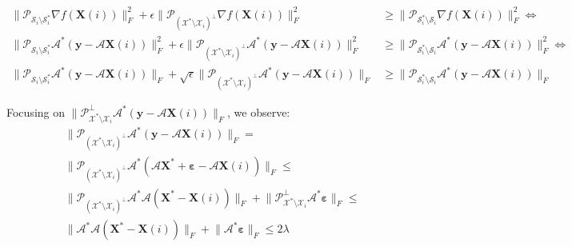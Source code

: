 \documentclass[twocolumn]{svjour3}
\newcommand{\vectornormbig}[1]{\big\|#1\big\|}
\newcommand{\obs}{\boldsymbol{y}}
\newcommand{\sensing}{\boldsymbol{\mathcal{A}}}
\newcommand{\signal}{\boldsymbol{X}}
\newcommand{\bestsignal}{\boldsymbol{X}^\ast}
\newcommand{\noise}{\boldsymbol{\varepsilon}}
\begin{document}
\begin{figure*}[!htp]
\begin{align}
\vectornormbig{\mathcal{P}_{\mathcal{S}_i \setminus \mathcal{S}_i^\ast} \nabla f(\signal(i))}_F^2 + \epsilon\vectornormbig{\mathcal{P}_{(\mathcal{X}^\ast\setminus \mathcal{X}_i)^\bot} \nabla f(\signal(i))}_F^2 &\geq \vectornormbig{\mathcal{P}_{\mathcal{S}_i^\ast \setminus \mathcal{S}_i} \nabla f(\signal(i))}_F^2 \Leftrightarrow \nonumber \\
\vectornormbig{\mathcal{P}_{\mathcal{S}_i \setminus \mathcal{S}_i^\ast} \sensing^\ast(\obs - \sensing \signal(i))}_F^2 + \epsilon\vectornormbig{\mathcal{P}_{(\mathcal{X}^\ast\setminus \mathcal{X}_i)^\bot} \sensing^\ast(\obs - \sensing \signal(i))}_F^2 &\geq \vectornormbig{\mathcal{P}_{\mathcal{S}_i^\ast \setminus \mathcal{S}_i} \sensing^\ast(\obs - \sensing \signal(i))}_F^2 \Leftrightarrow \nonumber \\
\vectornormbig{\mathcal{P}_{\mathcal{S}_i \setminus \mathcal{S}_i^\ast} \sensing^\ast(\obs - \sensing \signal(i))}_F + \sqrt{\epsilon}\vectornormbig{\mathcal{P}_{(\mathcal{X}^\ast\setminus \mathcal{X}_i)^\bot} \sensing^\ast(\obs - \sensing \signal(i))}_F &\geq \vectornormbig{\mathcal{P}_{\mathcal{S}_i^\ast \setminus \mathcal{S}_i} \sensing^\ast(\obs - \sensing \signal(i))}_F \label{eq:appr_act:04a}
\end{align}
\hrulefill
\end{figure*}
Focusing on $ \vectornormbig{\mathcal{P}_{\mathcal{X}^\ast\setminus \mathcal{X}_i}^\bot \sensing^\ast(\obs - \sensing \signal(i))}_F $, we observe:
\begin{align}
&\vectornormbig{\mathcal{P}_{(\mathcal{X}^\ast\setminus \mathcal{X}_i)^\bot} \sensing^\ast(\obs - \sensing \signal(i))}_F = \nonumber \\ 
&\vectornormbig{\mathcal{P}_{(\mathcal{X}^\ast\setminus \mathcal{X}_i)^\bot} \sensing^\ast(\sensing \bestsignal + \noise  - \sensing \signal(i))}_F \leq \nonumber \\ &\vectornormbig{\mathcal{P}_{(\mathcal{X}^\ast\setminus \mathcal{X}_i)^\bot} \sensing^\ast\sensing (\bestsignal - \signal(i))}_F + \vectornormbig{\mathcal{P}_{\mathcal{X}^\ast\setminus \mathcal{X}_i}^\bot \sensing^\ast \noise}_F \leq \nonumber \\ 
&\vectornormbig{\sensing^\ast\sensing (\bestsignal - \signal(i))}_F + \vectornormbig{\sensing^\ast \noise}_F \leq 2\lambda
\label{eq:appr_act:04}
\end{align} 
\end{document}
